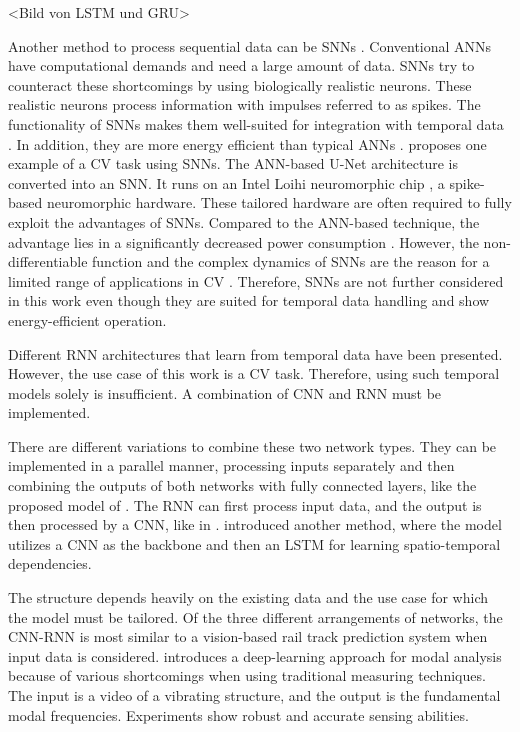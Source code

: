 <Bild von LSTM und GRU>

Another method to process sequential data can be \ac{SNN}s \cite{spikingNeuralNetworksReview2022}.
Conventional \ac{ANN}s have computational demands and need a large amount of data.
\ac{SNN}s try to counteract these shortcomings by using biologically realistic neurons.
These realistic neurons process information with impulses referred to as spikes.
The functionality of \ac{SNN}s makes them well-suited for integration with temporal data \cite{spikingNeuralNetworksReview2022}.
In addition, they are more energy efficient than typical \ac{ANN}s \cite{spikingNeuralNetworks2019}.
\cite{uNetAsSNN2021} proposes one example of a \ac{CV} task using \ac{SNN}s.
The \ac{ANN}-based U-Net architecture is converted into an \ac{SNN}.
It runs on an Intel Loihi neuromorphic chip \cite{Loihi2018}, a spike-based neuromorphic hardware.
These tailored hardware are often required to fully exploit the advantages of \ac{SNN}s.
Compared to the \ac{ANN}-based technique, the advantage lies in a significantly decreased power consumption \cite{uNetAsSNN2021}.
However, the non-differentiable function and the complex dynamics of \ac{SNN}s are the reason for a limited range of applications in \ac{CV} \cite{spikingNeuralNetworksReview2022} \cite{spikingNeuralNetworks2019}.
Therefore, \ac{SNN}s are not further considered in this work even though they are suited for temporal data handling and show energy-efficient operation.

Different \ac{RNN} architectures that learn from temporal data have been presented.
However, the use case of this work is a \ac{CV} task.
Therefore, using such temporal models solely is insufficient.
A combination of \ac{CNN} and \ac{RNN} must be implemented.

There are different variations to combine these two network types.
They can be implemented in a parallel manner, processing inputs separately and then combining the outputs of both networks with fully connected layers, like the proposed model of \cite{CNNLSTMparallel2021}.
The \ac{RNN} can first process input data, and the output is then processed by a \ac{CNN}, like in \cite{LSTMCNN2022}.
\cite{CNNLSTM2020} introduced another method, where the model utilizes a \ac{CNN} as the backbone and then an \ac{LSTM} for learning spatio-temporal dependencies.

The structure depends heavily on the existing data and the use case for which the model must be tailored.
Of the three different arrangements of networks, the \ac{CNN}-\ac{RNN} \cite{CNNLSTM2020} is most similar to a vision-based rail track prediction system when input data is considered.
\cite{CNNLSTM2020} introduces a deep-learning approach for modal analysis because of various shortcomings when using traditional measuring techniques.
The input is a video of a vibrating structure, and the output is the fundamental modal frequencies.
Experiments show robust and accurate sensing abilities.


